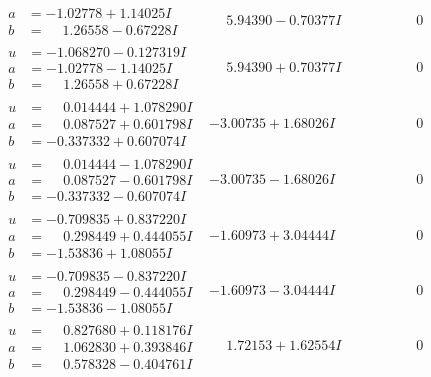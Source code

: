 \documentclass[1p]{elsarticle_modified}
\theoremstyle{definition}
\begin{document}
$$\begin{array}{c|c|c}
\begin{aligned}
a &= -1.02778 + 1.14025 I \\
b &= \phantom{-}1.26558 - 0.67228 I\end{aligned}
 & \phantom{-}5.94390 - 0.70377 I & \phantom{-0.000000 } 0 \\ \hline\begin{aligned}
u &= -1.068270 - 0.127319 I \\
a &= -1.02778 - 1.14025 I \\
b &= \phantom{-}1.26558 + 0.67228 I\end{aligned}
 & \phantom{-}5.94390 + 0.70377 I & \phantom{-0.000000 } 0 \\ \hline\begin{aligned}
u &= \phantom{-}0.014444 + 1.078290 I \\
a &= \phantom{-}0.087527 + 0.601798 I \\
b &= -0.337332 + 0.607074 I\end{aligned}
 & -3.00735 + 1.68026 I & \phantom{-0.000000 } 0 \\ \hline\begin{aligned}
u &= \phantom{-}0.014444 - 1.078290 I \\
a &= \phantom{-}0.087527 - 0.601798 I \\
b &= -0.337332 - 0.607074 I\end{aligned}
 & -3.00735 - 1.68026 I & \phantom{-0.000000 } 0 \\ \hline\begin{aligned}
u &= -0.709835 + 0.837220 I \\
a &= \phantom{-}0.298449 + 0.444055 I \\
b &= -1.53836 + 1.08055 I\end{aligned}
 & -1.60973 + 3.04444 I & \phantom{-0.000000 } 0 \\ \hline\begin{aligned}
u &= -0.709835 - 0.837220 I \\
a &= \phantom{-}0.298449 - 0.444055 I \\
b &= -1.53836 - 1.08055 I\end{aligned}
 & -1.60973 - 3.04444 I & \phantom{-0.000000 } 0 \\ \hline\begin{aligned}
u &= \phantom{-}0.827680 + 0.118176 I \\
a &= \phantom{-}1.062830 + 0.393846 I \\
b &= \phantom{-}0.578328 - 0.404761 I\end{aligned}
 & \phantom{-}1.72153 + 1.62554 I & \phantom{-0.000000 } 0 \\ \hline\begin{aligned}

\end{aligned}
\end{array}$$
\end{document}
